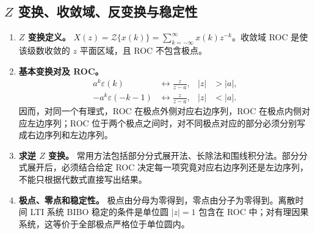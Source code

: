 \documentclass[12pt,a4paper]{ctexart}
\newcommand{\eps}{\varepsilon}
\begin{document}
\subsection{$Z$ 变换、收敛域、反变换与稳定性}
\begin{enumerate}
\item \textbf{$Z$ 变换定义。} \(\displaystyle X(z)=\mathcal Z\{x(k)\}=\sum_{k=-\infty}^{\infty}x(k)z^{-k}\)。收敛域 ROC 是使该级数收敛的 $z$ 平面区域，且 ROC 不包含极点。

\item \textbf{基本变换对及 ROC。} \[\begin{aligned}
a^k\eps(k)&\longleftrightarrow\frac{z}{z-a},& |z|&>|a|,\\
-a^k\eps(-k-1)&\longleftrightarrow\frac{z}{z-a},& |z|&<|a|.
\end{aligned}\] 因而，对同一个有理式，ROC 在极点外侧对应右边序列，ROC 在极点内侧对应左边序列；ROC 位于两个极点之间时，对不同极点对应的部分必须分别写成右边序列和左边序列。

\item \textbf{求逆 $Z$ 变换。} 常用方法包括部分分式展开法、长除法和围线积分法。部分分式展开后，必须结合给定 ROC 决定每一项究竟对应右边序列还是左边序列，不能只根据代数式直接写出结果。

\item \textbf{极点、零点和稳定性。} 极点由分母为零得到，零点由分子为零得到。离散时间 LTI 系统 BIBO 稳定的条件是单位圆 $|z|=1$ 包含在 ROC 中；对有理因果系统，这等价于全部极点严格位于单位圆内。
\end{enumerate}
\end{document}
